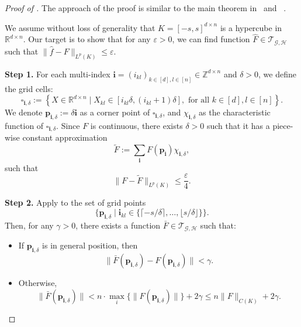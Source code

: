 \documentclass{article}
\begin{document}
\begin{proof}[Proof of ]
    The approach of the proof is similar to the main theorem in~\cite{li2022deep} and ~\cite{li2024deep}.

    We assume without loss of generality that
    $
    K = [-s,s]^{d\times n}
    $
    is a hypercube in $\mathbb{R}^{d\times n}$. Our target is to show that for any $\varepsilon >0$, we can find function $\hat F\in \mathcal{T}_{\mathcal{G},\mathcal{H}}$ such that
    $
    \|\hat f-F\|_{L^p(K)}\le \varepsilon
    $.

    \medskip
    \textbf{Step 1.} For each multi-index $\mathbf i=(i_{kl})_{k\in [d], l\in [n]}\in \mathbb Z^{d\times n}$ and $\delta>0$, we define the grid cells:
    \begin{equation}
        \square_{\mathbf i, \delta}:=\left\{X\in \mathbb R^{d\times n}\mid X_{kl}\in [i_{kl}\delta, (i_{kl}+1)\delta], \text{ for all } k\in [d], l\in [n]\right\}.
    \end{equation}
    We denote $\bm p_{\mathbf i,\delta}:=\delta\mathbf i$ as a corner point of $\square_{\mathbf i, \delta}$, and $\chi_{\bm i, \delta}$ as the characteristic function of $\square_{\bm i, \delta}$.
    Since $F$ is continuous, there exists $\delta> 0$ such that it has a piece-wise constant approximation
    \begin{equation}
        \tilde F:=\sum_{\mathbf i} F(\bm p_{\mathbf i})\chi_{\mathbf i, \delta},
    \end{equation}
    such that
    \begin{equation}
        \|F-\tilde F\|_{L^p(K)}\le \frac{\varepsilon}{4}.
    \end{equation}

    \medskip
    \noindent\textbf{Step 2.}
    Apply  to the set of grid points
    \[
    \Big\{ \bm{p}_{\mathbf{i},\delta} \mid \mathbf{i}_{kl}\in\Big\{\lceil -s/\delta \rceil, \dots, \lfloor s/\delta \rfloor\Big\} \Big\}.
    \]
    Then, for any $\gamma > 0$, there exists a function $\bar{F} \in \mathcal{T}_{\mathcal{G},\mathcal{H}}$ such that:
    \begin{itemize}
        \item If $\bm{p}_{\mathbf{i},\delta}$ is in general position, then
        \[
        \|\bar{F}(\bm{p}_{\mathbf{i},\delta}) - F(\bm{p}_{\mathbf{i},\delta})\| < \gamma.
        \]
        \item Otherwise,
        \[
        \|\bar{F}(\bm{p}_{\mathbf{i},\delta})\| < n\cdot\max_i\{\|F(\bm{p}_{\mathbf{i},\delta})\|\} + 2\gamma\le n\|F\|_{C(K)} + 2\gamma.
        \]
    \end{itemize}



\end{proof}
\end{document}
